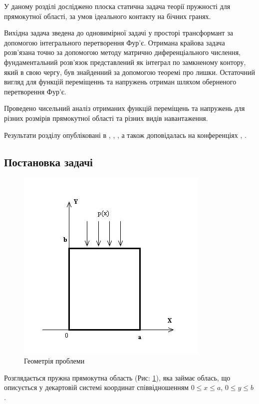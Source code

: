 У даному розділі досліджено плоска статична задача теорії пружності для прямокутної області,
за умов ідеального контакту на бічних гранях.

Вихідна задача зведена до одновимірної задачі у просторі трансформант за допомогою інтегрального перетворення Фур'є.
Отримана крайова задача розв'язана точно за допомогою методу матрично диференціального числення,
фундаментальний розв'язок представлений як інтеграл по замкненому контору, який в свою чергу, був знайденний за допомогою теоремі про лишки.
Остаточний вигляд для функцій переміщеннь та напружень отриман шляхом оберненого перетворення Фур'є.

Проведено чисельний аналіз отриманих функцій переміщень та напружень для різних розмірів прямокутної області та різних видів навантаження.

Результати розділу опубліковані в \cite{pozhylenkov_1}, \cite{pozhylenkov_2}, \cite{pozhylenkov_3},
а також доповідалась на конференціях \cite{conf_1}, \cite{conf_2}.

\subsection{Постановка задачі}
\begin{figure}[h]
    \begin{center}
        \includegraphics[scale=1]{images/geometry/image_3.jpg}
    \end{center}
    \caption{Геометрія проблеми}\label{geom_static_1}
\end{figure}
Розглядається пружна прямокутна область (Рис: \ref{geom_static_1}), яка займає облась,
що описується у декартовій системі координат співвідношенням $0 \le x \le a$, $0 \le y \le b$.

